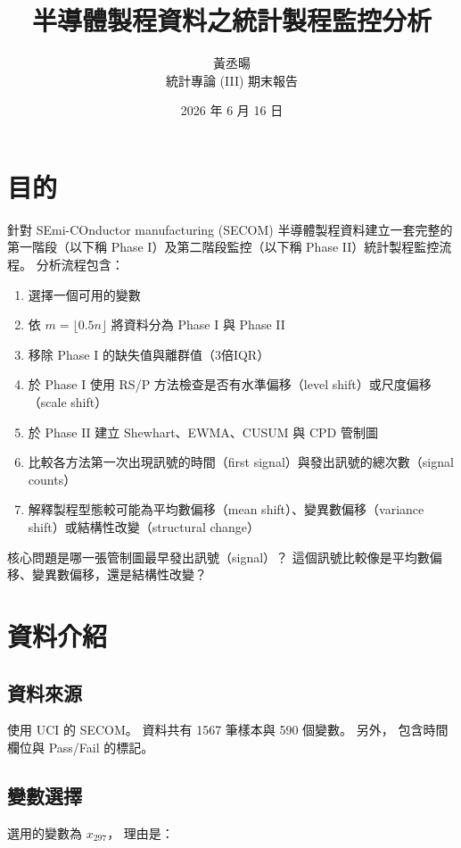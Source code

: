 \documentclass[a4paper, 12pt]{report}  %
\title{\textbf{半導體製程資料之統計製程監控分析}}
\author{黃丞暘 \quad 611211106\\統計專論 (III) 期末報告}
\date{2026 年 6 月 16 日}
\begin{document}
\maketitle

\chapter{目的}

針對 SEmi-COnductor manufacturing (SECOM) 半導體製程資料建立一套完整的第一階段（以下稱 Phase I）及第二階段監控（以下稱 Phase II）統計製程監控流程。
分析流程包含：

\begin{enumerate}[label=(\arabic*)]
  \item 選擇一個可用的變數
  \item 依 \(m=\lfloor 0.5n \rfloor\) 將資料分為 Phase I 與 Phase II
  \item 移除 Phase I 的缺失值與離群值（3倍IQR）
  \item 於 Phase I 使用 RS/P 方法檢查是否有水準偏移（level shift）或尺度偏移（scale shift）
  \item 於 Phase II 建立 Shewhart、EWMA、CUSUM 與 CPD 管制圖
  \item 比較各方法第一次出現訊號的時間（first signal）與發出訊號的總次數（signal counts）
  \item 解釋製程型態較可能為平均數偏移（mean shift）、變異數偏移（variance shift）或結構性改變（structural change）
\end{enumerate}

核心問題是哪一張管制圖最早發出訊號（signal）？
這個訊號比較像是平均數偏移、變異數偏移，還是結構性改變？

\chapter{資料介紹}

\section*{資料來源}

使用 UCI 的 SECOM。
資料共有 1567 筆樣本與 590 個變數。
另外，
包含時間欄位與 Pass/Fail 的標記。

\section*{變數選擇}

選用的變數為 \(x_{297}\)，
理由是：
\end{document}
